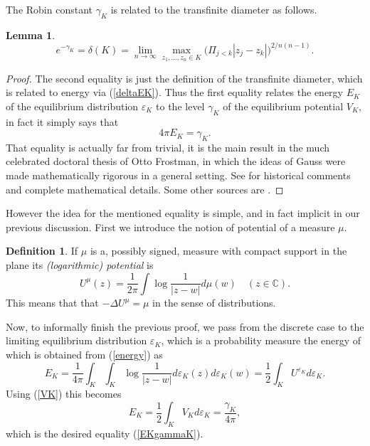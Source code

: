 \documentclass[reqno,12pt]{article}
\theoremstyle{plain}
\newtheorem{lemma}[thm]{Lemma}
\theoremstyle{definition}
\newtheorem{definition}{Definition}[section]
\numberwithin{equation}{section}
\numberwithin{figure}{section}
\def\C{{\mathbb C}}
\begin{document}
The Robin constant $\gamma_K$ is related to the transfinite diameter as follows.
\begin{lemma}\label{lem:gammadelta}
$$
e^{-\gamma_K}=\delta(K)=\lim_{n\to \infty}\max_{z_1,\dots,z_n\in K}\Big(\Pi_{j<k}|z_j-z_k|\Big)^{2/n(n-1)}.
$$ 
\end{lemma}
\begin{proof}
The second equality is just the definition of the transfinite diameter, which is related to energy 
via (\ref{deltaEK}). Thus the first equality relates the energy $E_K$ of the equilibrium distribution $\varepsilon_K$
to the level $\gamma_K$ of  the equilibrium potential $V_K$, 
in fact it simply says that 
\begin{equation}\label{EKgammaK}
4\pi E_K=\gamma_K.
\end{equation}
That equality is actually far from trivial,
it is the main result in the much celebrated doctoral thesis \cite{Frostman-1935} of Otto Frostman,
in which the ideas of Gauss were made mathematically rigorous in a general setting. See \cite{Doob-1984}
for historical comments and complete mathematical details.
Some other sources are \cite{Sario-Oikawa-1969, Ahlfors-1973, Ransford-1995}.   
\end{proof}

However the idea for the mentioned equality is simple, and in fact implicit in our previous discussion.
First we introduce the notion of potential of a measure $\mu$.
\begin{definition} 
If $\mu$ is a, possibly signed, measure with compact support in the plane its  {\it (logarithmic) potential} is 
\begin{equation*}
U^\mu(z)=\frac{1}{2\pi}\int \log \frac{1}{|z-w|}d\mu(w) \quad (z\in \C).
\end{equation*} 
This means that that $-\Delta U^\mu=\mu$ in the sense of distributions.
\end{definition}
 
Now, to informally finish the previous proof,  we pass 
from the discrete case to the limiting equilibrium distribution $\varepsilon_K$, 
which is a probability measure the energy of which is obtained from (\ref{energy})
as
$$
E_K=\frac{1}{4\pi}\int_K\int_K \log\frac{1}{|z-w|}d\varepsilon_K(z)d\varepsilon_K(w)
=\frac{1}{2}\int_K U^{\varepsilon_K}d\varepsilon_K.
$$ 
Using (\ref{VK}) this becomes
\begin{equation}\label{EK}
E_K=\frac{1}{2}\int_K V_K d\varepsilon_K=\frac{\gamma_K}{4\pi},
\end{equation}
which is the desired equality (\ref{EKgammaK}).
\end{document}

